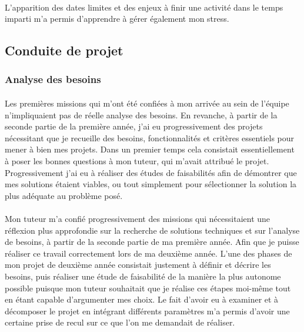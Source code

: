 \documentclass[12pt,a4paper]{report}
\begin{document}
\paragraph*{}L'apparition des dates limites et des enjeux à finir une activité dans le temps imparti m'a permis d'apprendre à gérer également mon stress. \\

\subsection{Conduite de projet}
\subsubsection{Analyse des besoins}
\paragraph*{}Les premières missions qui m'ont été confiées à mon arrivée au sein de l'équipe n'impliquaient pas de réelle analyse des besoins. En revanche, à partir de la seconde partie de la première année, j'ai eu progressivement des projets nécessitant que je recueille des besoins, fonctionnalités et critères essentiels pour mener à bien mes projets. Dans un premier temps cela consistait essentiellement à poser les bonnes questions à mon tuteur, qui m'avait attribué le projet. Progressivement j'ai eu à réaliser des études de faisabilités afin de démontrer que mes solutions étaient viables, ou tout simplement pour sélectionner la solution la plus adéquate au problème posé.
\paragraph*{}Mon tuteur m'a confié progressivement des missions qui nécessitaient une réflexion plus approfondie sur la recherche de solutions techniques et sur l'analyse de besoins, à partir de la seconde partie de ma première année. Afin que je puisse réaliser ce travail correctement lors de ma deuxième année. L'une des phases de mon projet de deuxième année consistait justement à définir et décrire les besoins, puis réaliser une étude de faisabilité de la manière la plus autonome possible puisque mon tuteur souhaitait que je réalise ces étapes moi-même tout en étant capable d'argumenter mes choix. Le fait d'avoir eu à examiner et à décomposer le projet en intégrant différents paramètres m'a permis d'avoir une certaine prise de recul sur ce que l'on me demandait de réaliser. \\
\end{document}
